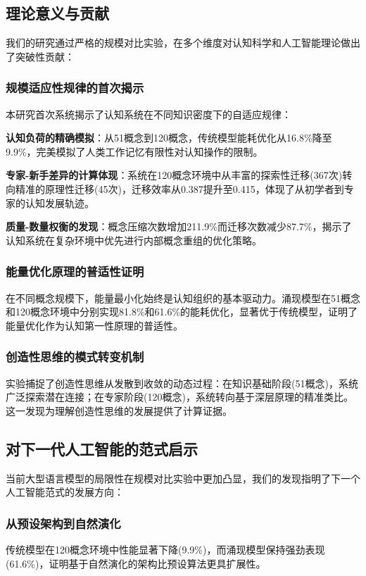 \documentclass[12pt,a4paper]{article}
\begin{document}
\subsection{理论意义与贡献}

我们的研究通过严格的规模对比实验，在多个维度对认知科学和人工智能理论做出了突破性贡献：

\subsubsection{规模适应性规律的首次揭示}

本研究首次系统揭示了认知系统在不同知识密度下的自适应规律：

\textbf{认知负荷的精确模拟}：从51概念到120概念，传统模型能耗优化从16.8\%降至9.9\%，完美模拟了人类工作记忆有限性对认知操作的限制。

\textbf{专家-新手差异的计算体现}：系统在120概念环境中从丰富的探索性迁移(367次)转向精准的原理性迁移(45次)，迁移效率从0.387提升至0.415，体现了从初学者到专家的认知发展轨迹。

\textbf{质量-数量权衡的发现}：概念压缩次数增加211.9\%而迁移次数减少87.7\%，揭示了认知系统在复杂环境中优先进行内部概念重组的优化策略。

\subsubsection{能量优化原理的普适性证明}
在不同概念规模下，能量最小化始终是认知组织的基本驱动力。涌现模型在51概念和120概念环境中分别实现81.8\%和61.6\%的能耗优化，显著优于传统模型，证明了能量优化作为认知第一性原理的普适性。

\subsubsection{创造性思维的模式转变机制}
实验捕捉了创造性思维从发散到收敛的动态过程：在知识基础阶段(51概念)，系统广泛探索潜在连接；在专家阶段(120概念)，系统转向基于深层原理的精准类比。这一发现为理解创造性思维的发展提供了计算证据。

\subsection{对下一代人工智能的范式启示}

当前大型语言模型的局限性在规模对比实验中更加凸显，我们的发现指明了下一个人工智能范式的发展方向：

\subsubsection{从预设架构到自然演化}
传统模型在120概念环境中性能显著下降(9.9\%)，而涌现模型保持强劲表现(61.6\%)，证明基于自然演化的架构比预设算法更具扩展性。
\end{document}
